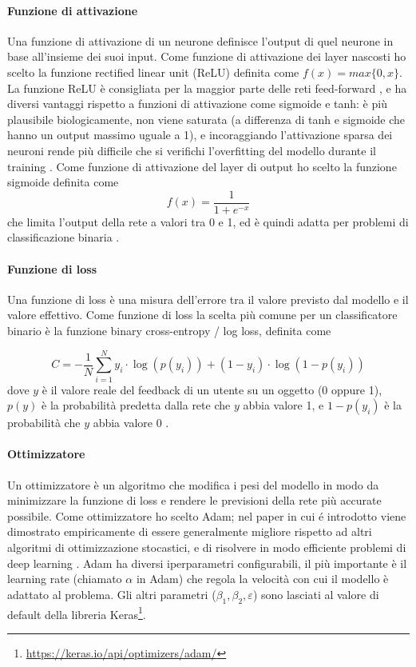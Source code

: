 \documentclass[12pt,italian]{report}
\begin{document}
\paragraph{Funzione di attivazione}
Una funzione di attivazione di un neurone definisce l'output di quel neurone in base all'insieme dei suoi input. Come funzione di attivazione dei layer nascosti ho scelto la funzione rectified linear unit (ReLU) definita come $f(x) = max\{0, x\}$. La funzione ReLU è consigliata per la maggior parte delle reti feed-forward \cite{Goodfellow-et-al-2016}, e ha diversi vantaggi rispetto a funzioni di attivazione come sigmoide e tanh: è più plausibile biologicamente, non viene saturata (a differenza di tanh e sigmoide che hanno un output massimo uguale a 1), e incoraggiando l'attivazione sparsa dei neuroni rende più difficile che si verifichi l'overfitting del modello durante il training \cite{relu}. Come funzione di attivazione del layer di output ho scelto la funzione sigmoide definita come 
$$f
(x) = \frac{1}{1+e^{-x}}
$$
che limita l'output della rete a valori tra 0 e 1, ed è quindi adatta per problemi di classificazione binaria \cite{choose-act-func}. 
\paragraph{Funzione di loss}
Una funzione di loss è una misura dell'errore tra il valore previsto dal modello e il valore effettivo. Come funzione di loss la scelta più comune per un classificatore binario è la funzione binary cross-entropy / log loss, definita come

$$
C = -\frac{1}{N} \sum_{i=1}^N y_i \cdot \log(p(y_i)) + (1-y_i) \cdot \log(1-p(y_i))
$$
dove $y$ è il valore reale del feedback di un utente su un oggetto (0 oppure 1), $p(y)$ è la probabilità predetta dalla rete che $y$ abbia valore 1, e $1-p(y_i)$ è la probabilità che $y$ abbia valore 0 \cite{cross-entropy}.

\paragraph{Ottimizzatore}
Un ottimizzatore è un algoritmo che modifica i pesi del modello in modo da minimizzare la funzione di loss e rendere le previsioni della rete più accurate possibile. Come ottimizzatore ho scelto Adam; nel paper in cui é introdotto viene dimostrato empiricamente di essere generalmente migliore rispetto ad altri algoritmi di ottimizzazione stocastici, e di risolvere in modo efficiente problemi di deep learning \cite{adam}. Adam ha diversi iperparametri configurabili, il più importante è il learning rate (chiamato $\alpha$ in Adam) che regola la velocità con cui il modello è adattato al problema. Gli altri parametri ($\beta_1, \beta_2, \varepsilon$) sono lasciati al valore di default della libreria Keras\footnote{\url{https://keras.io/api/optimizers/adam/}}. 
\end{document}
